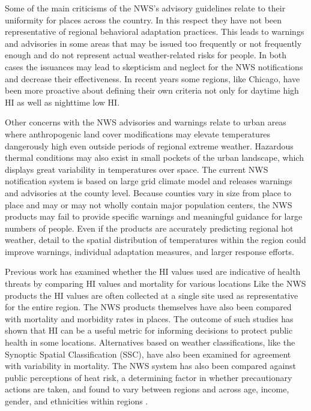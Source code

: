 \documentclass{ametsoc}
\begin{document}
Some of the main criticisms of the NWS's advisory guidelines relate to their uniformity for places across the country. In this respect they have not been representative of regional behavioral adaptation practices. This leads to warnings and advisories in some areas that may be issued too frequently or not frequently enough and do not represent actual weather-related risks for people. In both cases the issuances may lead to skepticism and neglect for the NWS notifications and decrease their effectiveness. In recent years some regions, like Chicago, have been more proactive about defining their own criteria not only for daytime high HI as well as nighttime low HI.

Other concerns with the NWS advisories and warnings relate to urban areas where anthropogenic land cover modifications may elevate temperatures dangerously high even outside periods of regional extreme weather. Hazardous thermal conditions may also exist in small pockets of the urban landscape, which displays great variability in temperatures over space.  The current NWS notification system is based on large grid climate model and releases warnings and advisories at the county level. Because counties vary in size from place to place and may or may not wholly contain major population centers, the NWS products may fail to provide specific warnings and meaningful guidance for large numbers of people. Even if the products are accurately predicting regional hot weather, detail to the spatial distribution of temperatures within the region could improve warnings, individual adaptation measures, and larger response efforts.

Previous work has examined whether the HI values used are indicative of health threats by comparing HI values and mortality for various locations\citep{Kalkstein1989,Gaffen1998} Like the NWS products the HI values are often collected at a single site used as representative for the entire region. The NWS products themselves have also been compared with mortality and morbidity rates in places. The outcome of such studies has shown that HI can be a useful metric for informing decisions to protect public health in some locations. Alternatives based on weather classifications, like the Synoptic Spatial Classification (SSC), have also been examined for agreement with variability in mortality. The NWS system has also been compared against public perceptions of heat risk, a determining factor in whether precautionary actions are taken, and found to vary between regions and across age, income, gender, and ethnicities within regions \citep{Kalkstein2007}.
\end{document}
